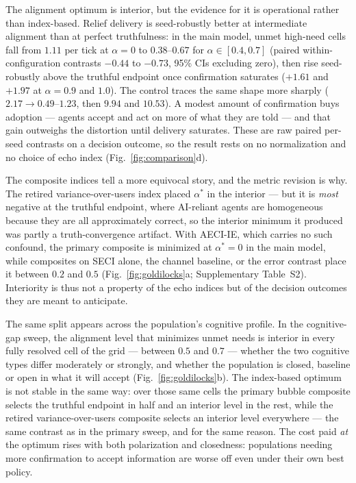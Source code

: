 \documentclass[pdflatex,sn-nature]{sn-jnl}
\begin{document}
The alignment optimum is interior, but the evidence for it is operational rather than index-based. Relief delivery is seed-robustly better at intermediate alignment than at perfect truthfulness: in the main model, unmet high-need cells fall from $1.11$ per tick at $\alpha = 0$ to $0.38$--$0.67$ for $\alpha \in [0.4, 0.7]$ (paired within-configuration contrasts $-0.44$ to $-0.73$, 95\% CIs excluding zero), then rise seed-robustly above the truthful endpoint once confirmation saturates ($+1.61$ and $+1.97$ at $\alpha = 0.9$ and $1.0$). The control traces the same shape more sharply ($2.17 \rightarrow 0.49$--$1.23$, then $9.94$ and $10.53$). A modest amount of confirmation buys adoption --- agents accept and act on more of what they are told --- and that gain outweighs the distortion until delivery saturates. These are raw paired per-seed contrasts on a decision outcome, so the result rests on no normalization and no choice of echo index (Fig.~\ref{fig:comparison}d).

The composite indices tell a more equivocal story, and the metric revision is why. The retired variance-over-users index placed $\alpha^{*}$ in the interior --- but it is \emph{most} negative at the truthful endpoint, where AI-reliant agents are homogeneous because they are all approximately correct, so the interior minimum it produced was partly a truth-convergence artifact. With AECI-IE, which carries no such confound, the primary composite is minimized at $\alpha^{*} = 0$ in the main model, while composites on SECI alone, the channel baseline, or the error contrast place it between $0.2$ and $0.5$ (Fig.~\ref{fig:goldilocks}a; Supplementary Table~S2). Interiority is thus not a property of the echo indices but of the decision outcomes they are meant to anticipate.

The same split appears across the population's cognitive profile. In the cognitive-gap sweep, the alignment level that minimizes unmet needs is interior in every fully resolved cell of the grid --- between $0.5$ and $0.7$ --- whether the two cognitive types differ moderately or strongly, and whether the population is closed, baseline or open in what it will accept (Fig.~\ref{fig:goldilocks}b). The index-based optimum is not stable in the same way: over those same cells the primary bubble composite selects the truthful endpoint in half and an interior level in the rest, while the retired variance-over-users composite selects an interior level everywhere --- the same contrast as in the primary sweep, and for the same reason. The cost paid \emph{at} the optimum rises with both polarization and closedness: populations needing more confirmation to accept information are worse off even under their own best policy.
\end{document}
